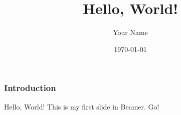 \documentclass{beamer}
\title{Hello, World!}
\author{Your Name}
\date{\today}
\begin{document}
\frame{\titlepage}

\begin{frame}
    \frametitle{Introduction}
    Hello, World! This is my first slide in Beamer. Go!
\end{frame}
\end{document}
